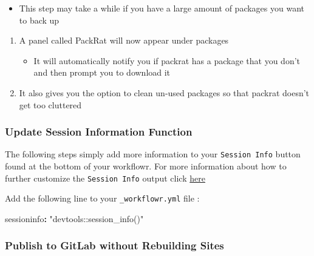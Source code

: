 \documentclass[openany]{book}
\newenvironment{Shaded}{\begin{snugshade}}{\end{snugshade}}
\newcommand{\NormalTok}[1]{#1}
\newcommand{\OperatorTok}[1]{\textcolor[rgb]{0.81,0.36,0.00}{\textbf{#1}}}
\newcommand{\StringTok}[1]{\textcolor[rgb]{0.31,0.60,0.02}{#1}}
\providecommand{\tightlist}{%
  \setlength{\itemsep}{0pt}\setlength{\parskip}{0pt}}
\begin{document}
\begin{itemize}
\tightlist
\item
  This step may take a while if you have a large amount of packages you want to back up
\end{itemize}

\begin{enumerate}
\def\labelenumi{\arabic{enumi}.}
\setcounter{enumi}{2}
\tightlist
\item
  A panel called PackRat will now appear under packages

  \begin{itemize}
  \tightlist
  \item
    It will automatically notify you if packrat has a package that you don't and then prompt you to download it
  \end{itemize}
\item
  It also gives you the option to clean un-used packages so that packrat doesn't get too cluttered
\end{enumerate}

\hypertarget{update-session-information-function-1}{%
\subsubsection{Update Session Information Function}\label{update-session-information-function-1}}

The following steps simply add more information to your \texttt{Session\ Info} button found at the bottom of your workflowr. For more information about how to further customize the \texttt{Session\ Info} output click \href{https://jdblischak.github.io/workflowr/articles/wflow-02-customization.html}{here}

Add the following line to your \texttt{\_workflowr.yml} file :

\begin{Shaded}
\begin{Highlighting}[]
\NormalTok{sessioninfo}\OperatorTok{:}\StringTok{ "devtools::session_info()"}
\end{Highlighting}
\end{Shaded}

\hypertarget{publish-to-gitlab-without-rebuilding-sites-1}{%
\subsubsection{Publish to GitLab without Rebuilding Sites}\label{publish-to-gitlab-without-rebuilding-sites-1}}
\end{document}
